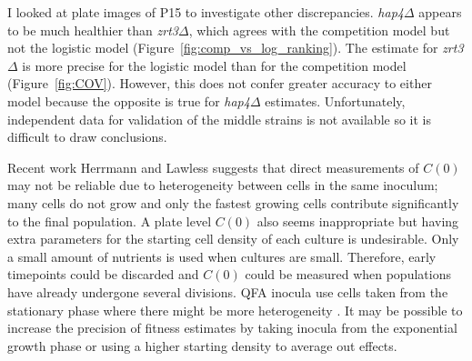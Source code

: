 I looked at plate images of P15 to investigate other discrepancies.
\textit{hap4\(\Delta\)} appears to be much healthier than
\textit{zrt3\(\Delta\)}, which agrees with the competition model but
not the logistic model (Figure~\ref{fig:comp_vs_log_ranking}). The
estimate for \textit{zrt3\(\Delta\)} is more precise for the logistic
model than for the competition model (Figure~\ref{fig:COV}). However,
this does not confer greater accuracy to either model because the
opposite is true for \textit{hap4\(\Delta\)} estimates. Unfortunately,
independent data for validation of the middle strains is not available
so it is difficult to draw conclusions.

Recent work Herrmann and Lawless suggests that direct measurements of
\(C(0)\) may not be reliable due to heterogeneity between cells in the
same inoculum; many cells do not grow and only the fastest growing
cells contribute significantly to the final population. A plate level
\(C(0)\) also seems inappropriate but having extra parameters for the
starting cell density of each culture is undesirable. Only a small
amount of nutrients is used when cultures are small. Therefore, early
timepoints could be discarded and \(C(0)\) could be measured when
populations have already undergone several divisions. QFA inocula use
cells taken from the stationary phase where there might be more
heterogeneity \citep{bergkessel2016}. It may be possible to increase
the precision of fitness estimates by taking inocula from the
exponential growth phase or using a higher starting density to average
out effects.

